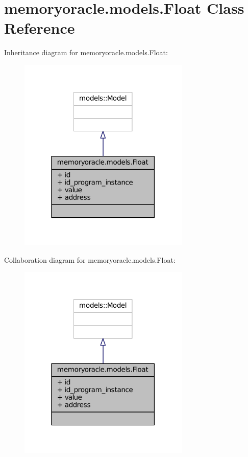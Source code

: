 \hypertarget{classmemoryoracle_1_1models_1_1Float}{}\section{memoryoracle.\+models.\+Float Class Reference}
\label{classmemoryoracle_1_1models_1_1Float}


Inheritance diagram for memoryoracle.\+models.\+Float\+:
\nopagebreak
\begin{figure}[H]
\begin{center}
\leavevmode
\includegraphics[width=231pt]{classmemoryoracle_1_1models_1_1Float__inherit__graph}
\end{center}
\end{figure}


Collaboration diagram for memoryoracle.\+models.\+Float\+:
\nopagebreak
\begin{figure}[H]
\begin{center}
\leavevmode
\includegraphics[width=231pt]{classmemoryoracle_1_1models_1_1Float__coll__graph}
\end{center}
\end{figure}
